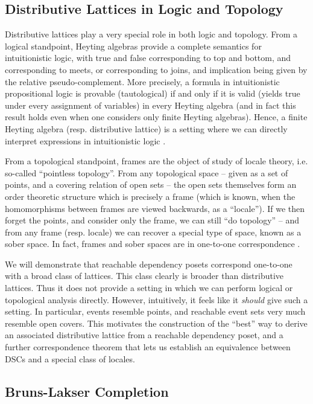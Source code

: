 \documentclass[hoptionsi,review,screen,format=acmsmall]{acmart}
\theoremstyle{definition}
\begin{document}
\subsection{Distributive Lattices in Logic and Topology}

Distributive lattices play a very special role in both logic and topology. From a logical standpoint, Heyting algebras provide a complete semantics for intuitionistic logic, with true and false corresponding to top and bottom, and corresponding to meets, or corresponding to joins, and implication being given by the relative pseudo-complement. More precisely, a formula in intuitionistic propositional logic is provable (tautological) if and only if it is valid (yields true under every assignment of variables) in every Heyting algebra (and in fact this result holds even when one considers only finite Heyting algebras). Hence, a finite Heyting algebra (resp. distributive lattice) is a setting where we can directly interpret expressions in intuitionistic logic \cite{van1988troelstra}.

From a topological standpoint, frames are the object of study of locale theory, i.e. so-called ``pointless topology''. From any topological space -- given as a set of points, and a covering relation of open sets -- the open sets themselves form an order theoretic structure which is precisely a frame (which is known, when the homomorphisms between frames are viewed backwards, as a ``locale''). If we then forget the points, and consider only the frame, we can still ``do topology'' -- and from any frame (resp. locale) we can recover a special type of space, known as a sober space. In fact, frames and sober spaces are in one-to-one correspondence \cite{johnstone1982stone, vickers1996topology}.

We will demonstrate that reachable dependency posets correspond one-to-one with a broad class of lattices. This class clearly is broader than distributive lattices. Thus it does not provide a setting in which we can perform logical or topological analysis directly. However, intuitively, it feels like it \textit{should} give such a setting. In particular, events resemble points, and reachable event sets very much resemble open covers. This motivates the construction of the ``best'' way to derive an associated distributive lattice from a reachable dependency poset, and a further correspondence theorem that lets us establish an equivalence between DSCs and a special class of locales.

\subsection{Bruns-Lakser Completion}
\end{document}
